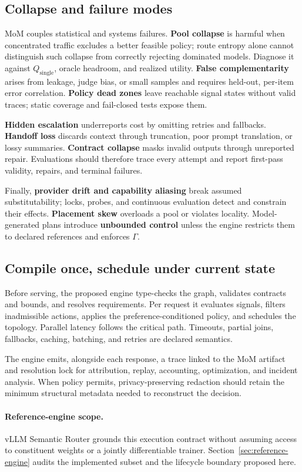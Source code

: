 \subsection{Collapse and failure modes}

MoM couples statistical and systems failures. \textbf{Pool collapse} is harmful
when concentrated traffic excludes a better feasible policy; route entropy
alone cannot distinguish such collapse from correctly rejecting dominated
models. Diagnose it against $Q_{\mathrm{single}}$, oracle headroom, and realized
utility. \textbf{False complementarity} arises from leakage,
judge bias, or small samples and requires held-out, per-item error correlation.
\textbf{Policy dead zones} leave reachable signal states without valid traces;
static coverage and fail-closed tests expose them.

\textbf{Hidden escalation} underreports cost by omitting retries and fallbacks.
\textbf{Handoff loss} discards context through truncation, poor prompt
translation, or lossy summaries. \textbf{Contract collapse} masks invalid
outputs through unreported repair. Evaluations should therefore trace every
attempt and report first-pass validity, repairs, and terminal failures.

Finally, \textbf{provider drift and capability aliasing} break assumed
substitutability; locks, probes, and continuous evaluation detect and constrain
their effects. \textbf{Placement skew} overloads a pool or violates locality.
Model-generated plans introduce \textbf{unbounded control} unless the engine restricts them to declared
references and enforces $\Gamma$.

\subsection{Compile once, schedule under current state}

Before serving, the proposed engine type-checks the graph, validates contracts
and bounds, and resolves requirements. Per request it evaluates signals, filters
inadmissible actions, applies the preference-conditioned policy, and schedules
the topology.  Parallel latency follows the critical path.  Timeouts, partial
joins, fallbacks, caching, batching, and retries are declared semantics.

The engine emits, alongside each response, a trace linked to the MoM artifact
and resolution lock for attribution, replay, accounting, optimization, and
incident analysis. When policy permits, privacy-preserving redaction should
retain the minimum structural metadata needed to reconstruct the decision.

\paragraph{Reference-engine scope.}
vLLM Semantic Router grounds this execution contract without assuming access
to constituent weights or a jointly differentiable trainer.
Section~\ref{sec:reference-engine} audits the implemented subset and the
lifecycle boundary proposed here.
